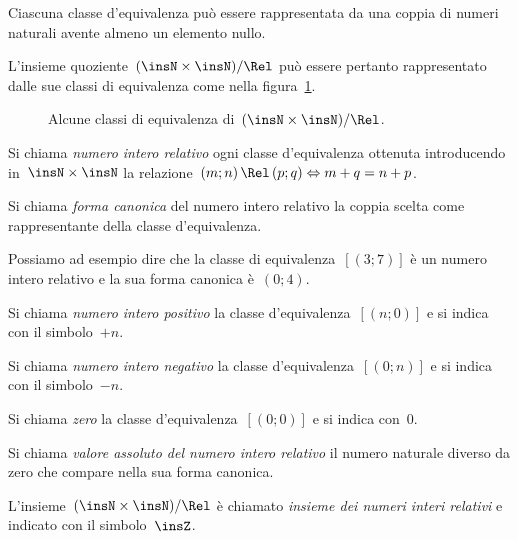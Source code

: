 \conclusione Ciascuna classe d'equivalenza può essere rappresentata da una coppia di numeri naturali avente almeno un elemento nullo.

L'insieme quoziente~$(\insN\times\insN)/\Rel$ può essere pertanto rappresentato dalle sue classi di equivalenza come nella figura~\ref{fig:E.3}.
\begin{figure}[t]
 \centering
 \caption{Alcune classi di equivalenza di~$(\insN\times\insN)/\Rel$.}\label{fig:E.3}
\end{figure}

\begin{definizione}
 Si chiama \emph{numero intero relativo} ogni classe d'equivalenza ottenuta introducendo in~$\insN\times\insN$ la
 relazione~$(m;n)\,\Rel\, (p;q) \Leftrightarrow m+q=n+p$.
 \end{definizione}

\begin{definizione}
Si chiama \emph{forma canonica} del numero intero relativo la coppia scelta come rappresentante della classe d'equivalenza.
\end{definizione}

Possiamo ad esempio dire che la classe di equivalenza~$[(3;7)]$ è un numero intero relativo e la sua forma canonica è~$(0;4)$.

\begin{definizione}
Si chiama \emph{numero intero positivo} la classe d'equivalenza~$[(n;0)]$ e si indica con il simbolo~$+n$.
\end{definizione}

\begin{definizione}
 Si chiama \emph{numero intero negativo} la classe d'equivalenza~$[(0;n)]$ e si indica con il simbolo~$-n$.
\end{definizione}

\begin{definizione}
 Si chiama \emph{zero} la classe d'equivalenza~$[(0;0)]$ e si indica con~$0$.
\end{definizione}

\begin{definizione}
 Si chiama \emph{valore assoluto del numero intero relativo} il numero naturale diverso da zero che compare nella sua forma canonica.
\end{definizione}

\begin{definizione}
 L'insieme~$(\insN\times \insN)/\Rel$ è chiamato \emph{insieme dei numeri interi relativi} e indicato con il simbolo~$\insZ$.
\end{definizione}

